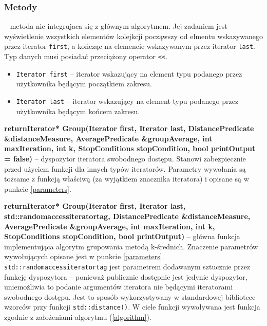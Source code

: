 \subsubsection{Metody}

\begin{description}
	\item[void DisplayCollection(Iterator first, Iterator last)]  -- metoda nie integrujaca się z głównym algorytmem. Jej zadaniem jest wyświetlenie wszystkich elementów kolejkcji począwszy od elmentu wskazywanego przez iterator \texttt{first}, a kończąc na elemencie wskazywanym przez iterator \texttt{last}. Typ danych musi posiadać przeciążony operator \texttt{<<}.
	\begin{itemize}
		\item \texttt{Iterator first} -- iterator wskazujący na element typu podanego przez użytkownika będącym początkiem zakresu.
		\item \texttt{Iterator last} -- iterator wskazujący na element typu podanego przez użytkownika będącym końcem zakresu.
	\end{itemize}
	
	\item \textbf{returnIterator* Group(Iterator first, Iterator last, DistancePredicate \&distanceMeasure, AveragePredicate \&groupAverage, int maxIteration, int k, StopConditions stopCondition, bool printOutput = false)} -- dyspozytor iteratora swobodnego dostępu. Stanowi zabezpiecznie przed użyciem funkcji dla innych typów iteratorów. Parametry wywołania są tożsame z funkcją właściwą (za wyjątkiem znacznika iteratora) i opisane są w punkcie \ref{parameters}.
	
	\item \textbf{returnIterator* Group(Iterator first, Iterator last, std::random\textunderscore access\textunderscore iterator\textunderscore tag, DistancePredicate \&distanceMeasure, AveragePredicate \&groupAverage, int maxIteration, int k, StopConditions stopCondition, bool printOutput)} -- główna funkcja implementująca algorytm grupowania metodą k-średnich. Znaczenie parametrów wywołujących opisane jest w punkcie \ref{parameters}. \texttt{std::random\textunderscore access\textunderscore iterator\textunderscore tag} jest parametrem dodawanym sztucznie przez funkcję dyspozytora -- ponieważ publicznie dostępnie jest jedynie dyspozytor, uniemożliwia to podanie argumentów iteratora nie będącymi iteratorami swobodnego dostępu. Jest to sposób wykorzystywany w standardowej bibliotece wzorców przy funkcji \texttt{std::distance()}. W ciele funkcji wywoływana jest funkcja zgodnie z założeniami algorytmu (\ref{algorithm}).
	

\end{description}
